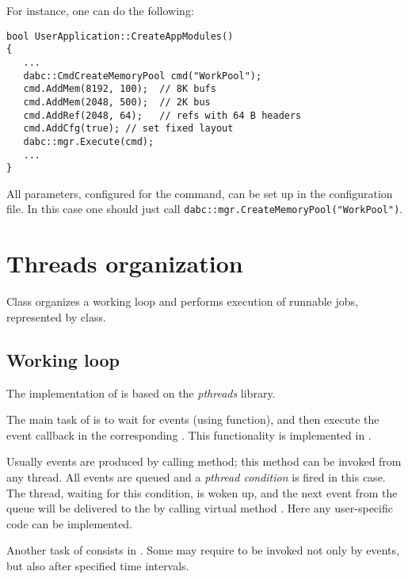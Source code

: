 For instance, one can do the following:

\begin{small}
\begin{verbatim}     
bool UserApplication::CreateAppModules()
{
   ...
   dabc::CmdCreateMemoryPool cmd("WorkPool");
   cmd.AddMem(8192, 100);  // 8K bufs
   cmd.AddMem(2048, 500);  // 2K bus
   cmd.AddRef(2048, 64);   // refs with 64 B headers
   cmd.AddCfg(true); // set fixed layout
   dabc::mgr.Execute(cmd);
   ...
}
\end{verbatim}     
\end{small}

All parameters, configured for the command, can be set up in the configuration file.
In this case one should just call {\tt dabc::mgr.CreateMemoryPool("WorkPool")}. 


\section{Threads organization}
\label{prog_services_threads}
Class  organizes a working loop and performs execution of
runnable jobs, represented by  class.


\subsection{Working loop}
\label{prog_services_threads_workloop}
The implementation of  is based on the 
{\em pthreads} library.
 
The main task of  is to wait for events (using  function),
and then execute the event callback in the corresponding
. 
This functionality is implemented  in .
 
Usually events are produced by calling  
method; this method can be invoked from any thread. All events are queued and a
{\em pthread condition} is fired in this case. 
The thread, waiting for this condition, is woken up, and the
next event from the queue will be delivered to the  by calling virtual method . 
Here any user-specific code can be implemented.

Another task of  consists in . 
Some  
may require to be invoked not only by events, but also after specified time intervals.

